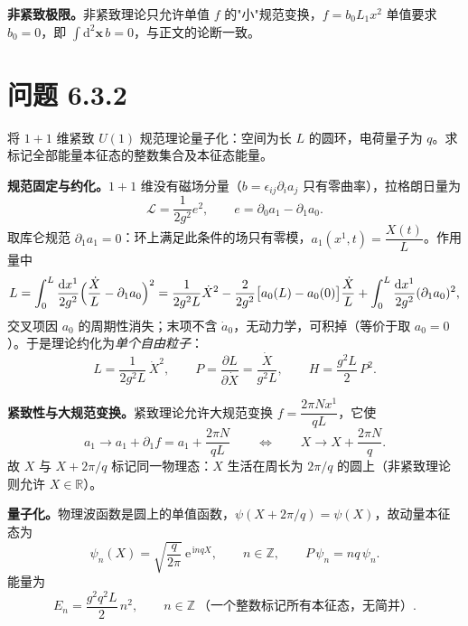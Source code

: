 \textbf{非紧致极限。}非紧致理论只允许单值 $f$ 的"小"规范变换，$f=b_0L_1x^2$ 单值要求 $b_0=0$，即 $\int\mathrm{d}^2\pmb x\,b=0$，与正文的论断一致。

\section*{问题 6.3.2}
\begin{problem}
将 $1+1$ 维紧致 $U(1)$ 规范理论量子化：空间为长 $L$ 的圆环，电荷量子为 $q$。求标记全部能量本征态的整数集合及本征态能量。
\end{problem}
\solution

\textbf{规范固定与约化。}$1+1$ 维没有磁场分量（$b=\epsilon_{ij}\partial_ia_j$ 只有零曲率），拉格朗日量为
\begin{equation*}
\mathcal{L}=\frac{1}{2g^2}e^2,\qquad e=\partial_0a_1-\partial_1a_0 .
\end{equation*}
取库仑规范 $\partial_1a_1=0$：环上满足此条件的场只有零模，$a_1(x^1,t)=\dfrac{X(t)}{L}$。作用量中
\begin{equation*}
L=\int_0^L\frac{\mathrm{d}x^1}{2g^2}\Bigl(\frac{\dot X}{L}-\partial_1a_0\Bigr)^{2}
=\frac{1}{2g^2L}\dot X^{2}
-\frac{2}{2g^2}\bigl[a_0(L)-a_0(0)\bigr]\frac{\dot X}{L}
+\int_0^L\frac{\mathrm{d}x^1}{2g^2}(\partial_1a_0)^{2} ,
\end{equation*}
交叉项因 $a_0$ 的周期性消失；末项不含 $\dot a_0$，无动力学，可积掉（等价于取 $a_0=0$）。于是理论约化为\emph{单个自由粒子}：
\begin{equation*}
L=\frac{1}{2g^2L}\,\dot X^{2},
\qquad
P=\frac{\partial L}{\partial\dot X}=\frac{\dot X}{g^2L},
\qquad
H=\frac{g^2L}{2}\,P^{2} .
\end{equation*}

\textbf{紧致性与大规范变换。}紧致理论允许大规范变换 $f=\dfrac{2\pi Nx^1}{qL}$，它使
\begin{equation*}
a_1\to a_1+\partial_1f=a_1+\frac{2\pi N}{qL}
\qquad\Longleftrightarrow\qquad
X\to X+\frac{2\pi N}{q} .
\end{equation*}
故 $X$ 与 $X+2\pi/q$ 标记同一物理态：$X$ 生活在周长为 $2\pi/q$ 的圆上（非紧致理论则允许 $X\in\mathbb{R}$）。

\textbf{量子化。}物理波函数是圆上的单值函数，$\psi(X+2\pi/q)=\psi(X)$，故动量本征态为
\begin{equation*}
\psi_n(X)=\sqrt{\frac{q}{2\pi}}\ \mathrm{e}^{\,\mathrm{i}nqX},
\qquad n\in\mathbb{Z},
\qquad
P\,\psi_n=nq\,\psi_n .
\end{equation*}
能量为
\begin{equation*}
\boxed{\ E_n=\frac{g^2q^2L}{2}\,n^{2},\qquad n\in\mathbb{Z}\ \text{（一个整数标记所有本征态，无简并）} .\ }
\end{equation*}

